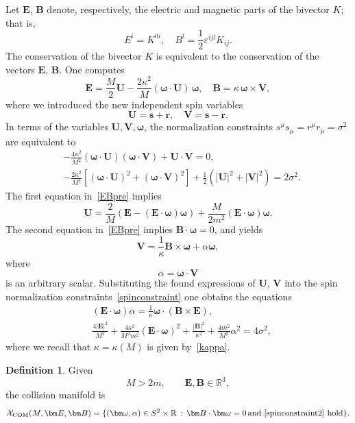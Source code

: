 \documentclass[12pt]{article}
\theoremstyle{plain}
\theoremstyle{definition}
\newtheorem{definition}[theorem]{Definition}
\newcommand{\R}{\mathbb{R}}
\begin{document}
Let $\bm E$, $\bm B$ denote, respectively, the electric and magnetic parts of the bivector $K$; that is,
\[
E^i=K^{0i},\quad B^l=\frac{1}{2}\varepsilon^{ijl}K_{ij}.
\]
The conservation of the bivector $K$ is equivalent to the conservation of the vectors $\bm E$, $\bm B$. 
One computes
\begin{equation}\label{EBpre}
\bm E=\frac{M}{2}{\bm U}-\frac{2\kappa^2}{M}(\bm \omega \cdot \bm U)\,\bm \omega ,\quad \bm B=\kappa\, \bm \omega \times \bm V,
\end{equation}
where we introduced the new independent spin variables
\begin{equation}\label{UV}
\bm U=\bm s+\bm r,\quad \bm V=\bm s-\bm r.
\end{equation}
In terms of the variables ${\bm U}, {\bm V}, {\bm \omega}$, the normalization constraints $s^\mu s_\mu=r^\mu r_\mu =\sigma^2$ are equivalent to
\begin{subequations}\label{spinconstraint}
\begin{align}
&-\frac{4\kappa^2}{M^2}({\bm \omega}\cdot{\bm U})({\bm \omega}\cdot{\bm V})+{\bm U}\cdot{\bm V}=0,\\
&-\frac{2\kappa^2}{M^2}[({\bm \omega}\cdot{\bm U})^2+({\bm \omega}\cdot{\bm V})^2]+\frac{1}{2}(|{\bm U}|^2+|{\bm V}|^2)=2\sigma^2.
\end{align}
\end{subequations}
The first equation in~\eqref{EBpre} implies
\begin{equation}\label{Uprime}
{\bm U}=\frac2M\left({\bm E}-({\bm E}\cdot \bm \omega  )\bm \omega  \right)+\frac{M}{2m^2}({\bm E}\cdot \bm \omega  )\bm \omega  .
\end{equation}
The second equation in~\eqref{EBpre} implies ${\bm B}\cdot \bm \omega  =0$, and yields
\begin{equation}\label{Vprime}
{\bm V}= \frac1\kappa {\bm B}\times \bm \omega  +\alpha \bm \omega  ,
\end{equation}
where
\begin{equation}\label{alpha}
\alpha=\bm \omega  \cdot {\bm V}
\end{equation}
is an arbitrary scalar.
Substituting the found expressions of ${\bm U}$, ${\bm V}$ into the spin normalization constraints~\eqref{spinconstraint} one obtains the equations
\begin{subequations}\label{spinconstraint2}
\begin{align}
&({\bm E}\cdot \bm \omega  )\alpha=\frac1\kappa \bm \omega  \cdot({\bm B}\times {\bm E}),\label{first}\\
&\frac{4|{\bm E}|^2}{M^2}+\frac{4\kappa^2}{M^2m^2}({\bm E}\cdot \bm \omega  )^2+\frac{|{\bm B}|^2}{\kappa^2}+\frac{4m^2}{M^2}\alpha^2=4\sigma^2\label{second},
\end{align}
\end{subequations}
where we recall that $\kappa=\kappa(M)$ is given by~\eqref{kappa}. 
\begin{definition}
Given
\[
M>2m,\qquad{\bm E},{\bm B}\in\mathbb R^3,
\]
the collision manifold is
\[
\mathcal{X}_\mathrm{COM}(M,{\bm E}, {\bm B})=\{(\bm\omega,\alpha)\in S^2\times\R\, :\, {\bm B}\cdot\bm\omega=0\,\text{and~\eqref{spinconstraint2} hold}\}.
\]
\end{definition}
\end{document}
